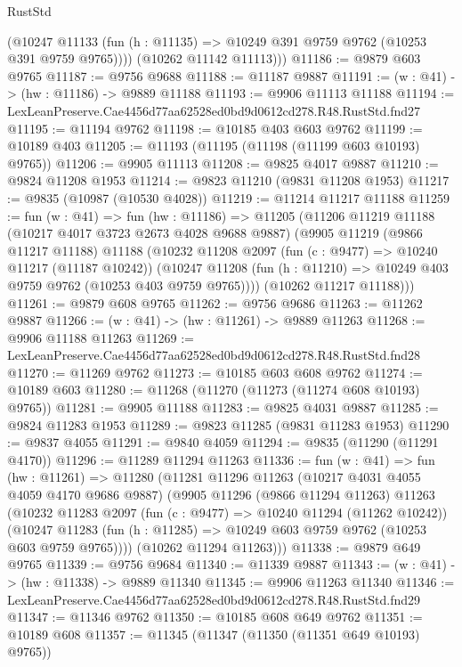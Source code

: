 \begin{lexlean}{RustStd}
\begin{coremodule}
          (@10247 @11133 (fun (h : @11135) => @10249 @391 @9759 @9762 (@10253 @391 @9759 @9765))))
        (@10262 @11142 @11113)))
@11186 := @9879 @603 @9765
@11187 := @9756 @9688
@11188 := @11187 @9887
@11191 := (w : @41) -> (hw : @11186) -> @9889 @11188
@11193 := @9906 @11113 @11188
@11194 := LexLeanPreserve.Cae4456d77aa62528ed0bd9d0612cd278.R48.RustStd.fnd27
@11195 := @11194 @9762
@11198 := @10185 @403 @603 @9762
@11199 := @10189 @403
@11205 := @11193 (@11195 (@11198 (@11199 @603 @10193) @9765))
@11206 := @9905 @11113
@11208 := @9825 @4017 @9887
@11210 := @9824 @11208 @1953
@11214 := @9823 @11210 (@9831 @11208 @1953)
@11217 := @9835 (@10987 (@10530 @4028))
@11219 := @11214 @11217 @11188
@11259 := fun (w : @41) =>
  fun (hw : @11186) =>
  @11205
    (@11206
      @11219
      @11188
      (@10217 @4017 @3723 @2673 @4028 @9688 @9887)
      (@9905
        @11219
        (@9866 @11217 @11188)
        @11188
        (@10232
          @11208
          @2097
          (fun (c : @9477) => @10240 @11217 (@11187 @10242))
          (@10247 @11208 (fun (h : @11210) => @10249 @403 @9759 @9762 (@10253 @403 @9759 @9765))))
        (@10262 @11217 @11188)))
@11261 := @9879 @608 @9765
@11262 := @9756 @9686
@11263 := @11262 @9887
@11266 := (w : @41) -> (hw : @11261) -> @9889 @11263
@11268 := @9906 @11188 @11263
@11269 := LexLeanPreserve.Cae4456d77aa62528ed0bd9d0612cd278.R48.RustStd.fnd28
@11270 := @11269 @9762
@11273 := @10185 @603 @608 @9762
@11274 := @10189 @603
@11280 := @11268 (@11270 (@11273 (@11274 @608 @10193) @9765))
@11281 := @9905 @11188
@11283 := @9825 @4031 @9887
@11285 := @9824 @11283 @1953
@11289 := @9823 @11285 (@9831 @11283 @1953)
@11290 := @9837 @4055
@11291 := @9840 @4059
@11294 := @9835 (@11290 (@11291 @4170))
@11296 := @11289 @11294 @11263
@11336 := fun (w : @41) =>
  fun (hw : @11261) =>
  @11280
    (@11281
      @11296
      @11263
      (@10217 @4031 @4055 @4059 @4170 @9686 @9887)
      (@9905
        @11296
        (@9866 @11294 @11263)
        @11263
        (@10232
          @11283
          @2097
          (fun (c : @9477) => @10240 @11294 (@11262 @10242))
          (@10247 @11283 (fun (h : @11285) => @10249 @603 @9759 @9762 (@10253 @603 @9759 @9765))))
        (@10262 @11294 @11263)))
@11338 := @9879 @649 @9765
@11339 := @9756 @9684
@11340 := @11339 @9887
@11343 := (w : @41) -> (hw : @11338) -> @9889 @11340
@11345 := @9906 @11263 @11340
@11346 := LexLeanPreserve.Cae4456d77aa62528ed0bd9d0612cd278.R48.RustStd.fnd29
@11347 := @11346 @9762
@11350 := @10185 @608 @649 @9762
@11351 := @10189 @608
@11357 := @11345 (@11347 (@11350 (@11351 @649 @10193) @9765))

\end{coremodule}
\end{lexlean}

